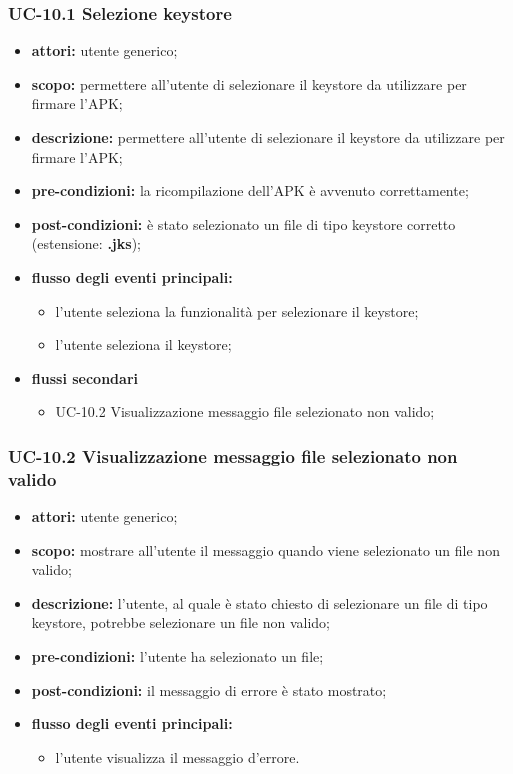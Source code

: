 \subsubsection{UC-10.1 Selezione keystore}\label{subsubsec:uc-10.1-selezione-keystore}
\begin{itemize}
    \item \textbf{attori:} utente generico;
    \item \textbf{scopo:} permettere all'utente di selezionare il keystore da utilizzare per firmare l'APK;
    \item \textbf{descrizione:} permettere all'utente di selezionare il keystore da utilizzare per firmare l'APK;
    \item \textbf{pre-condizioni:} la ricompilazione dell'APK è avvenuto correttamente;
    \item \textbf{post-condizioni:} è stato selezionato un file di tipo keystore corretto (estensione: \textbf{.jks});
    \item \textbf{flusso degli eventi principali:}
    \begin{itemize}
        \item l'utente seleziona la funzionalità per selezionare il keystore;
        \item l'utente seleziona il keystore;
    \end{itemize}
    \item \textbf{flussi secondari}
    \begin{itemize}
        \item UC-10.2 Visualizzazione messaggio file selezionato non valido;
    \end{itemize}
\end{itemize}
\subsubsection{UC-10.2 Visualizzazione messaggio file selezionato non valido}
\begin{itemize}
    \item \textbf{attori:} utente generico;
    \item \textbf{scopo:} mostrare all'utente il messaggio quando viene selezionato un file non valido;
    \item \textbf{descrizione:} l'utente, al quale è stato chiesto di selezionare un file di tipo keystore, potrebbe selezionare un file non valido;
    \item \textbf{pre-condizioni:} l'utente ha selezionato un file;
    \item \textbf{post-condizioni:} il messaggio di errore è stato mostrato;
    \item \textbf{flusso degli eventi principali:}
    \begin{itemize}
        \item l'utente visualizza il messaggio d'errore.
    \end{itemize}
\end{itemize}
